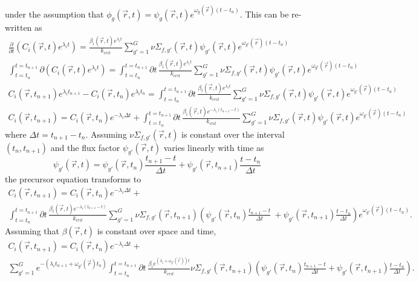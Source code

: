 \documentclass[12pt]{report}
\begin{document}
	under the assumption that $\phi_g(\vec{r},t) = \psi_g(\vec{r},t) e^{\omega_g(\vec{r}) (t-t_n)}$. This can be re-written as
	\begin{eqnarray}
	\frac{\partial}{\partial t} \left( C_i(\vec{r},t) e^{\lambda_i t} \right) = \frac{\beta_i(\vec{r},t) e^{\lambda_i t}}{k_{crit}} \sum_{g'=1}^{G} \nu \Sigma_{f,g'}(\vec{r},t) \psi_{g'}(\vec{r},t) e^{\omega_{g'}(\vec{r}) (t-t_n)} \nonumber \\
	\int_{t=t_n}^{t=t_{n+1}} \partial \left( C_i(\vec{r},t) e^{\lambda_i t} \right) = \int_{t=t_n}^{t=t_{n+1}}  \partial t \, \frac{\beta_i(\vec{r},t) e^{\lambda_i t}}{k_{crit}} \sum_{g'=1}^{G} \nu \Sigma_{f,g'}(\vec{r},t) \psi_{g'}(\vec{r},t) e^{\omega_{g'}(\vec{r}) (t-t_n)} \nonumber \\
	 C_i(\vec{r},t_{n+1}) e^{\lambda_i t_{n+1}} - C_i(\vec{r},t_{n}) e^{\lambda_i t_{n}} = \int_{t=t_n}^{t=t_{n+1}}  \partial t \, \frac{\beta_i(\vec{r},t) e^{\lambda_i t}}{k_{crit}} \sum_{g'=1}^{G} \nu \Sigma_{f,g'}(\vec{r},t) \psi_{g'}(\vec{r},t) e^{\omega_{g'}(\vec{r}) (t-t_n)} \nonumber \\
	 C_i(\vec{r},t_{n+1}) =  C_i(\vec{r},t_{n}) e^{-\lambda_i \Delta t} +  \int_{t=t_n}^{t=t_{n+1}}  \partial t \, \frac{\beta_i(\vec{r},t) e^{-\lambda_i \left(t_{n+1} - t \right)}}{k_{crit}} \sum_{g'=1}^{G} \nu \Sigma_{f,g'}(\vec{r},t) \psi_{g'}(\vec{r},t) e^{\omega_{g'}(\vec{r}) (t-t_n)} \nonumber
	\end{eqnarray}	
	where $\Delta t = t_{n+1} - t_n$. Assuming $\nu \Sigma_{f,g'}(\vec{r},t)$ is constant over the interval $(t_n, t_{n+1})$ and the flux factor $\psi_{g'}(\vec{r},t)$ varies linearly with time as
	\begin{equation}
	\psi_{g'}(\vec{r},t) = \psi_{g'}(\vec{r},t_n) \frac{t_{n+1}-t}{\Delta t} + \psi_{g'}(\vec{r},t_{n+1}) \frac{t-t_n}{\Delta t} 
	\end{equation}
	the precursor equation transforms to
	\begin{eqnarray}
	C_i(\vec{r},t_{n+1}) =  C_i(\vec{r},t_{n}) e^{-\lambda_i \Delta t} + \nonumber \\  \int_{t=t_n}^{t=t_{n+1}}  \partial t \, \frac{\beta_i(\vec{r},t) e^{-\lambda_i \left(t_{n+1} - t \right)}}{k_{crit}} \sum_{g'=1}^{G} \nu \Sigma_{f,g'}(\vec{r},t_{n+1}) \left( \psi_{g'}(\vec{r},t_n) \frac{t_{n+1}-t}{\Delta t} \ + \psi_{g'}(\vec{r},t_{n+1}) \frac{t-t_n}{\Delta t} \right) e^{\omega_{g'}(\vec{r}) (t-t_n)}. \nonumber
	\end{eqnarray}
	Assuming that $\beta(\vec{r},t)$ is constant over space and time,
	\begin{eqnarray}
	C_i(\vec{r},t_{n+1}) =  C_i(\vec{r},t_{n}) e^{-\lambda_i \Delta t} + \nonumber \\  \sum_{g'=1}^{G} e^{-\left(\lambda_i t_{n+1} + \omega_{g'}(\vec{r})t_n \right)} \int_{t=t_n}^{t=t_{n+1}}  \partial t \, \frac{\beta_i e^{\left(\lambda_i + \omega_{g'}(\vec{r}) \right)  t}}{k_{crit}}  \nu \Sigma_{f,g'}(\vec{r},t_{n+1}) \left( \psi_{g'}(\vec{r},t_n) \frac{t_{n+1}-t}{\Delta t} + \psi_{g'}(\vec{r},t_{n+1}) \frac{t-t_n}{\Delta t}  \right). \nonumber
	\end{eqnarray}
\end{document}
